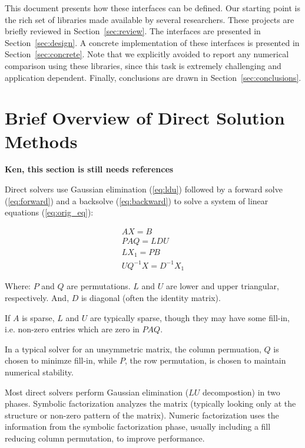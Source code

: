 \documentclass[acmtocl]{acmtrans2m}
\begin{document}
\medskip

This document presents how these interfaces can be
defined.  Our starting point is the rich set of libraries made available by
several researchers. These projects are briefly reviewed in
Section~\ref{sec:review}.  The interfaces are presented in
Section~\ref{sec:design}. A concrete implementation of these interfaces is
presented in Section~\ref{sec:concrete}.  Note that we explicitly avoided to
report any numerical comparison using these libraries, since this task
is extremely challenging and application dependent. Finally,
  conclusions are drawn in Section~\ref{sec:conclusions}. 

\section{Brief Overview of Direct Solution Methods}
\label{sec:theory}

{\bf Ken, this section is still needs references}

Direct solvers use Gaussian elimination (\ref{eq:ldu}) followed by a
forward solve (\ref{eq:forward}) and a backsolve (\ref{eq:backward})
to solve a system of linear equations (\ref{eq:orig_eq}):

\begin{eqnarray}
  \label{eq:orig_eq}
  A X = B \\ 
  \label{eq:ldu}
  PAQ = LDU \\
  \label{eq:forward}
  LX_1 = PB \\
  \label{eq:backward}
  UQ^{-1}X = D^{-1}X_1  
\end{eqnarray}

Where: $P$ and $Q$ are permutations.  $L$ and $U$ are lower and upper triangular, respectively.  And, $D$ is diagonal (often the identity matrix).  

If $A$ is sparse, $L$ and $U$
are typically sparse, though they may have some fill-in, i.e. non-zero entries which are zero in
$PAQ$.  

In a typical solver for an unsymmetric matrix, the column permuation,
$Q$ is chosen to minimze fill-in, while $P$, the row permutation, is
chosen to maintain numerical stability.  

Most direct solvers perform Gaussian elimination ($LU$ decompostion) in
two phases.  Symbolic factorization analyzes the matrix (typically
looking only at the structure or non-zero pattern of the matrix).
Numeric factorization uses the information from the symbolic
factorization phase, usually including a fill reducing column permutation, 
to improve performance.  
\end{document}
